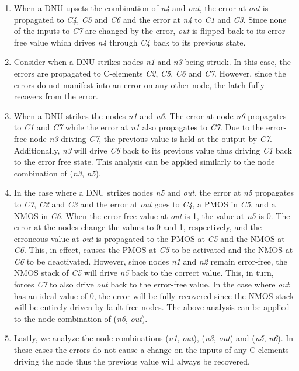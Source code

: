 \begin{enumerate}
	\item When a DNU upsets the combination of \textit{n4} and \textit{out}, the error at \textit{out} is propagated to \textit{C4}, \textit{C5} and \textit{C6} and the error at \textit{n4} to \textit{C1} and \textit{C3}. Since none of the inputs to \textit{C7} are changed by the error, \textit{out} is flipped back to its error-free value which drives \textit{n4} through \textit{C4} back to its previous state.

	\item Consider when a DNU strikes nodes \textit{n1} and \textit{n3} being struck. In this case, the errors are propagated to C-elements \textit{C2}, \textit{C5}, \textit{C6} and \textit{C7}. However, since the errors do not manifest into an error on any other node, the latch fully recovers from the error. 
	
	\item When a DNU strikes the nodes \textit{n1} and \textit{n6}. The error at node \textit{n6} propagates to  \textit{C1} and \textit{C7} while the error at \textit{n1} also propagates to \textit{C7}. Due to the error-free node \textit{n3} driving \textit{C7}, the previous value is held at the output by \textit{C7}. Additionally, \textit{n3} will drive \textit{C6} back to its previous value thus driving \textit{C1} back to the error free state. This analysis can be applied similarly to the node combination of (\textit{n3}, \textit{n5}). 

	\item In the case where a DNU strikes nodes \textit{n5} and \textit{out}, the error at \textit{n5} propagates to \textit{C7}, \textit{C2} and \textit{C3} and the error at \textit{out} goes to \textit{C4}, a PMOS in \textit{C5}, and a NMOS in \textit{C6}. When the error-free value at \textit{out} is 1, the value at \textit{n5} is 0. The error at the nodes change the values to 0 and 1, respectively, and the erroneous value at \textit{out} is propagated to the PMOS at \textit{C5} and the NMOS at \textit{C6}. This, in effect, causes the PMOS at \textit{C5} to be activated and the NMOS at \textit{C6} to be deactivated. However, since nodes \textit{n1} and \textit{n2} remain error-free, the NMOS stack of \textit{C5} will drive \textit{n5} back to the correct value. This, in turn, forces \textit{C7} to also drive \textit{out} back to the error-free value. In the case where \textit{out} has an ideal value of 0, the error will be fully recovered since the NMOS stack will be entirely driven by fault-free nodes. The above analysis can be applied to the node combination of (\textit{n6}, \textit{out}). 
	
	\item Lastly, we analyze the node combinations (\textit{n1}, \textit{out}), (\textit{n3}, \textit{out}) and (\textit{n5}, \textit{n6}). In these cases the errors do not cause a change on the inputs of any C-elements driving the node thus the previous value will always be recovered. 
\end{enumerate}

